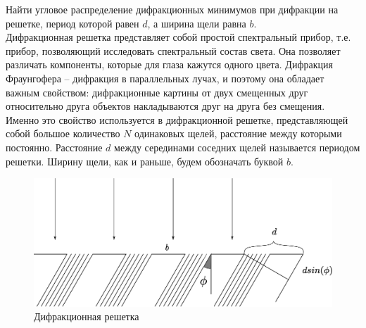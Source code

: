 \documentclass[__main__.tex]{subfiles}
\begin{document}
Найти угловое распределение дифракционных минимумов при дифракции на решетке, период которой равен $d$, а ширина щели равна $b$.\\

Дифракционная решетка представляет собой простой спектральный прибор, т.е. прибор, позволяющий исследовать спектральный состав света. Она позволяет различать компоненты, которые для глаза кажутся одного цвета.
Дифракция Фраунгофера – дифракция в параллельных лучах, и поэтому она обладает важным свойством: дифракционные картины от двух смещенных друг относительно друга объектов накладываются друг на друга без смещения. Именно это свойство используется в дифракционной решетке, представляющей собой большое количество $N$ одинаковых щелей, расстояние между которыми постоянно. Расстояние  $d$  между серединами соседних щелей называется периодом решетки. Ширину щели, как и раньше, будем обозначать буквой $b$.

\begin{figure}[h]
    \begin{center}
        \includegraphics[width=0.5\linewidth]{img/o-07_1.eps}
        \caption{Дифракционная решетка}
    \end{center}
\end{figure}
\end{document}
